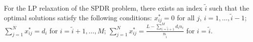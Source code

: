 

\begin{prop}\label{sol_relax_deter}
For the LP relaxation of the \textup{SPDR} problem, there exists an index $\tilde{i}$ such that the optimal solutions satisfy the following conditions: $x_{ij}^{*} = 0$ for all $j$, $i = 1,\ldots, \tilde{i}-1$; $\sum_{j=1}^{N} x_{ij}^{*} = d_{i}$ for $i = \tilde{i}+1,\ldots, M$; $\sum_{j=1}^{N} x_{ij}^{*} = \frac{L - \sum_{i = \tilde{i}+1}^{M} {d_i n_i}}{n_{\tilde{i}}}$ for $i = \tilde{i}$.
\end{prop}

